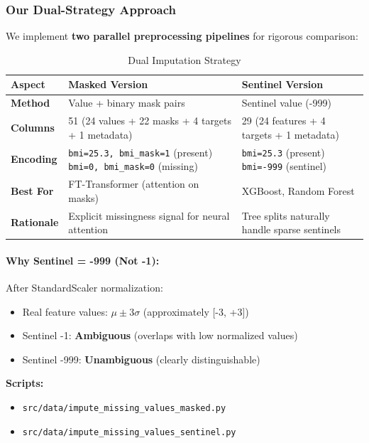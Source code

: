 \documentclass[12pt,a4paper]{article}
\begin{document}
\subsubsection{Our Dual-Strategy Approach}

We implement \textbf{two parallel preprocessing pipelines} for rigorous comparison:

\begin{table}[H]
\centering
\caption{Dual Imputation Strategy}
\begin{tabular}{p{3cm}p{5.5cm}p{5.5cm}}
\toprule
\textbf{Aspect} & \textbf{Masked Version} & \textbf{Sentinel Version} \\
\midrule
\textbf{Method} & Value + binary mask pairs & Sentinel value (-999) \\
\midrule
\textbf{Columns} & 51 (24 values + 22 masks + 4 targets + 1 metadata) & 29 (24 features + 4 targets + 1 metadata) \\
\midrule
\textbf{Encoding} & 
\texttt{bmi=25.3, bmi\_mask=1} (present) \newline
\texttt{bmi=0, bmi\_mask=0} (missing) & 
\texttt{bmi=25.3} (present) \newline
\texttt{bmi=-999} (sentinel) \\
\midrule
\textbf{Best For} & FT-Transformer (attention on masks) & XGBoost, Random Forest \\
\midrule
\textbf{Rationale} & Explicit missingness signal for neural attention & Tree splits naturally handle sparse sentinels \\
\bottomrule
\end{tabular}
\end{table}

\paragraph{Why Sentinel = -999 (Not -1):}
After StandardScaler normalization:
\begin{itemize}
    \item Real feature values: $\mu \pm 3\sigma$ (approximately [-3, +3])
    \item Sentinel -1: \textbf{Ambiguous} (overlaps with low normalized values)
    \item Sentinel -999: \textbf{Unambiguous} (clearly distinguishable)
\end{itemize}

\textbf{Scripts:}
\begin{itemize}
    \item \texttt{src/data/impute\_missing\_values\_masked.py}
    \item \texttt{src/data/impute\_missing\_values\_sentinel.py}
\end{itemize}
\end{document}
